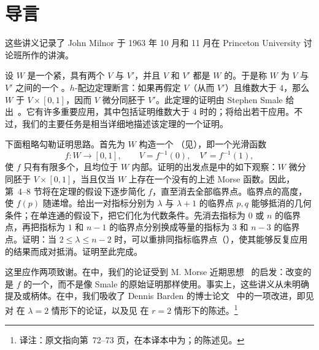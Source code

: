 \chapter*{导言}
\label{sec:0}

这些讲义记录了 John Milnor 于 1963 年 10 月和 11 月在 Princeton University 讨论班所作的讲演。

设 $W$ 是一个紧，具有两个 $V$ 与 $V'$，并且 $V$ 和 $V'$ 都是 $W$ 的。于是称 $W$ 为 $V$ 与 $V'$ 之间的一个 。$h$-配边定理断言：如果再假定 $V$（从而 $V'$）且维数大于 $4$，那么 $W$ 于 $V\times[0,1]$，因而 $V$ 微分同胚于 $V'$。此定理的证明由 Stephen Smale 给出~\cite{ref06}。它有许多重要应用，其中包括证明维数大于 $4$ 时的；将给出若干应用。不过，我们的主要任务是相当详细地描述该定理的一个证明。

下面粗略勾勒证明思路。首先为 $W$ 构造一个 （见），即一个光滑函数
\[
  f:W\longrightarrow[0,1],\qquad V=f^{-1}(0),\quad V'=f^{-1}(1),
\]
使 $f$ 只有有限多个，且均位于 $W$ 内部。证明的出发点是中的如下观察：$W$ 微分同胚于 $V\times[0,1]$，当且仅当 $W$ 上存在一个没有的上述 Morse 函数。因此，第~4--8 节将在定理的假设下逐步简化 $f$，直至消去全部临界点。临界点的高度，使 $f(p)$ 随递增。给出一对指标分别为 $\lambda$ 与 $\lambda+1$ 的临界点 $p,q$ 能够抵消的几何条件；在单连通的假设下，把它们化为代数条件。先消去指标为 $0$ 或 $n$ 的临界点，再把指标为 $1$ 和 $n-1$ 的临界点分别换成等量的指标为 $3$ 和 $n-3$ 的临界点。证明：当 $2\leq\lambda\leq n-2$ 时，可以重排同指标临界点（），使其能够反复应用的结果而成对抵消。证明至此完成。

这里应作两项致谢。在中，我们的论证受到 M. Morse 近期思想~\cite{ref11,ref32} 的启发：改变的是 $f$ 的一个，而不是像 Smale 的原始证明那样使用。事实上，这些讲义从未明确提及或柄体。在中，我们吸收了 Dennis Barden 的博士论文~\cite{ref33} 中的一项改进，即见对 在 $\lambda=2$ 情形下的论证，以及见 在 $r=2$ 情形下的陈述。\footnote{译注：原文指向第~72--73 页，在本译本中为；的陈述见。}

